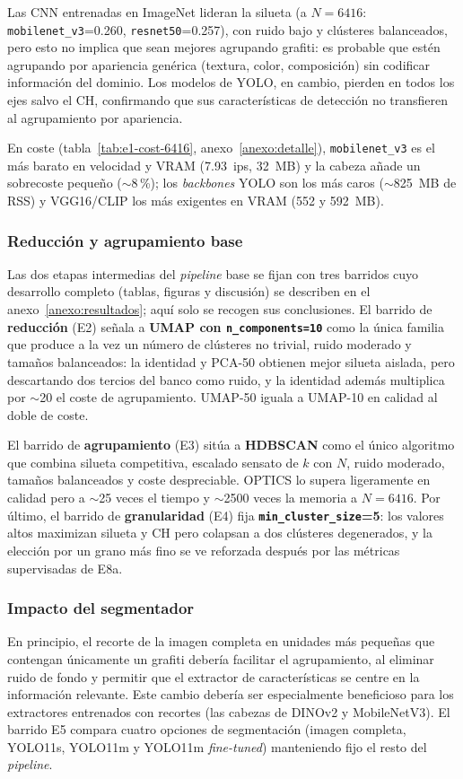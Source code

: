 Las CNN entrenadas en ImageNet lideran la silueta (a $N=6416$:
\texttt{mobilenet\_v3}=0.260, \texttt{resnet50}=0.257), con ruido bajo y
clústeres balanceados, pero esto no implica que sean mejores agrupando grafiti:
es probable que estén agrupando por apariencia genérica (textura, color,
composición) sin codificar información del dominio. Los modelos de YOLO, en
cambio, pierden en todos los ejes salvo el CH, confirmando que sus
características de detección no transfieren al agrupamiento por apariencia.

En coste (tabla~\ref{tab:e1-cost-6416}, anexo~\ref{anexo:detalle}),
\texttt{mobilenet\_v3} es el más barato en velocidad y VRAM (7.93~ips, 32~MB) y
la cabeza añade un sobrecoste pequeño ($\sim$8\,\%); los \textit{backbones}
YOLO son los más caros ($\sim$825~MB de RSS) y VGG16/CLIP los más exigentes en
VRAM (552 y 592~MB).

\subsubsection{Reducción y agrupamiento base}
\label{subsubsec:res-reduccion-resumen}
Las dos etapas intermedias del \textit{pipeline} base se fijan con tres
barridos cuyo desarrollo completo (tablas, figuras y discusión) se describen en
el anexo~\ref{anexo:resultados}; aquí solo se recogen sus conclusiones. El
barrido de \textbf{reducción} (E2) señala a \textbf{UMAP con
\texttt{n\_components=10}} como la única familia que produce a la vez un número
de clústeres no trivial, ruido moderado y tamaños balanceados: la identidad y
PCA-50 obtienen mejor silueta aislada, pero descartando dos tercios del banco
como ruido, y la identidad además multiplica por $\sim$20 el coste de
agrupamiento. UMAP-50 iguala a UMAP-10 en calidad al doble de coste.

El barrido de \textbf{agrupamiento} (E3) sitúa a \textbf{HDBSCAN} como el único
algoritmo que combina silueta competitiva, escalado sensato de $k$ con $N$,
ruido moderado, tamaños balanceados y coste despreciable. OPTICS lo supera
ligeramente en calidad pero a $\sim$25 veces el tiempo y $\sim$2500 veces la
memoria a $N=6416$. Por último, el barrido de \textbf{granularidad} (E4) fija
\textbf{\texttt{min\_cluster\_size}=5}: los valores altos maximizan silueta y
CH pero colapsan a dos clústeres degenerados, y la elección por un grano más
fino se ve reforzada después por las métricas supervisadas de E8a.

\subsubsection{Impacto del segmentador}
\label{subsubsec:res-segmentador}
En principio, el recorte de la imagen completa en unidades más pequeñas que
contengan únicamente un grafiti debería facilitar el agrupamiento, al eliminar
ruido de fondo y permitir que el extractor de características se centre en la
información relevante. Este cambio debería ser especialmente beneficioso para
los extractores entrenados con recortes (las cabezas de DINOv2 y MobileNetV3).
El barrido E5 compara cuatro opciones de segmentación (imagen completa,
YOLO11s, YOLO11m y YOLO11m \textit{fine-tuned}) manteniendo fijo el resto del
\textit{pipeline}.


